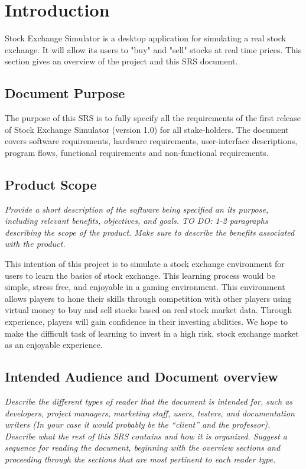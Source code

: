 \documentclass[12 pt, a4paper]{report}
\begin{document}
	
	
	\tableofcontents
	\chapter{Introduction}
	
	Stock Exchange Simulator is a desktop application for simulating a real stock exchange. It will allow its users to "buy" and "sell" stocks at real time prices. This section gives an overview of the project and this SRS document.
	\section {Document Purpose}
	The purpose of this SRS is to fully specify all the requirements of the first release of Stock Exchange Simulator (version 1.0) for all stake-holders. The document covers software requirements, hardware requirements, user-interface descriptions, program flows, functional requirements and non-functional requirements.
	
	\section{Product Scope}
	\textit{Provide a short description of the software being specified an its purpose, including relevant benefits, objectives, and goals. TO DO: 1-2 paragraphs describing the scope of the product. Make sure to describe the benefits associated with the product.}
		
	This intention of this project is to simulate a stock exchange environment for  users to learn the basics of stock exchange. This learning process would be simple, stress free, and enjoyable in a gaming environment. This environment allows players to hone their skills through competition with other players using virtual money to  buy and sell stocks based on real stock market data. Through experience, players will gain confidence in their investing abilities. We hope to make the difficult task of learning to invest in a high risk, stock exchange market as an enjoyable experience.
	
	\section{Intended Audience and Document overview}
	\textit{Describe the different types of reader that the document is intended for, such as developers, project managers, marketing staff, users, testers, and documentation writers (In your case it would probably be the “client” and the professor). Describe what the rest of this SRS contains and how it is organized. Suggest a sequence for reading the document, beginning with the overview sections and proceeding through the sections that are most pertinent to each reader type.}
	
\end{document}
